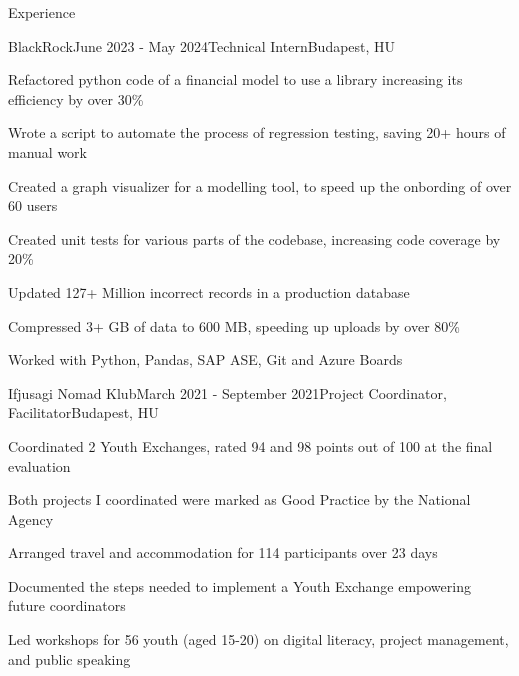 \documentclass[
	a4paper, %
	11pt, %
]{resume} %
\begin{document}
\begin{rSection}{Experience}

	\begin{rSubsection}{BlackRock}{June 2023 - May 2024}{Technical Intern}{Budapest, HU}
		\item Refactored python code of a financial model to use a library increasing its efficiency by over 30\%
		\item Wrote a script to automate the process of regression testing, saving 20+ hours of manual work
		\item Created a graph visualizer for a modelling tool, to speed up the onbording of over 60 users
		\item Created unit tests for various parts of the codebase, increasing code coverage by 20\%
		\item Updated 127+ Million incorrect records in a production database
		\item Compressed 3+ GB of data to 600 MB, speeding up uploads by over 80\%
		\item Worked with Python, Pandas, SAP ASE, Git and Azure Boards
	\end{rSubsection}

	\begin{rSubsection}{Ifjusagi Nomad Klub}{March 2021 - September 2021}{Project Coordinator, Facilitator}{Budapest, HU}
		\item Coordinated 2 Youth Exchanges, rated 94 and 98 points out of 100 at the final evaluation
		\item Both projects I coordinated were marked as Good Practice by the National Agency
		\item Arranged travel and accommodation for 114 participants over 23 days
		\item Documented the steps needed to implement a Youth Exchange empowering future coordinators
		\item Led workshops for 56 youth (aged 15-20) on digital literacy, project management, and public speaking
	\end{rSubsection}

\end{rSection}

\end{document}
